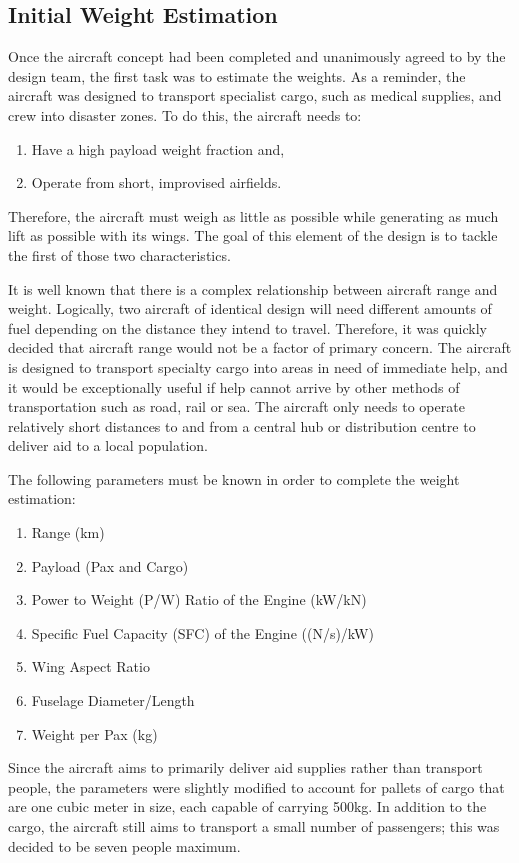 \documentclass[stu, a4paper, 12pt, floatsintext]{apa7}
\numberwithin{figure}{section}
\numberwithin{table}{section}
\numberwithin{equation}{section}
\begin{document}
\subsection{Initial Weight Estimation}
Once the aircraft concept had been completed and unanimously agreed to by the design team, the first task was to estimate the weights. As a reminder, the aircraft was designed to transport specialist cargo, such as medical supplies, and crew into disaster zones. To do this, the aircraft needs to:
\begin{enumerate}
    \item Have a high payload weight fraction and, 
    \item Operate from short, improvised airfields.
\end{enumerate}

Therefore, the aircraft must weigh as little as possible while generating as much lift as possible with its wings. The goal of this element of the design is to tackle the first of those two characteristics. 

It is well known that there is a complex relationship between aircraft range and weight. Logically, two aircraft of identical design will need different amounts of fuel depending on the distance they intend to travel. Therefore, it was quickly decided that aircraft range would not be a factor of primary concern. The aircraft is designed to transport specialty cargo into areas in need of immediate help, and it would be exceptionally useful if help cannot arrive by other methods of transportation such as road, rail or sea. The aircraft only needs to operate relatively short distances to and from a central hub or distribution centre to deliver aid to a local population. 

The following parameters must be known in order to complete the weight estimation:
\begin{enumerate}
    \item Range (km)
    \item Payload (Pax and Cargo)
    \item Power to Weight (P/W) Ratio of the Engine (kW/kN)
    \item Specific Fuel Capacity (SFC) of the Engine ((N/s)/kW)
    \item Wing Aspect Ratio
    \item Fuselage Diameter/Length
    \item Weight per Pax (kg)
\end{enumerate}

Since the aircraft aims to primarily deliver aid supplies rather than transport people, the parameters were slightly modified to account for pallets of cargo that are one cubic meter in size, each capable of carrying 500kg. In addition to the cargo, the aircraft still aims to transport a small number of passengers; this was decided to be seven people maximum.
\end{document}
